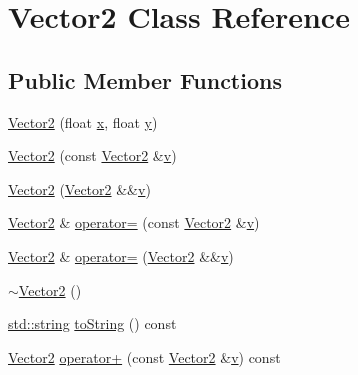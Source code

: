 \hypertarget{class_vector2}{}\section{Vector2 Class Reference}
\label{class_vector2}
\subsection*{Public Member Functions}
\begin{DoxyCompactItemize}
\item 
\mbox{\hyperlink{class_vector2_a061ab58a0e216c759d64e3746d712b12}{Vector2}} (float \mbox{\hyperlink{_s_d_l__opengl_8h_ad0e63d0edcdbd3d79554076bf309fd47}{x}}, float \mbox{\hyperlink{_s_d_l__opengl_8h_a1675d9d7bb68e1657ff028643b4037e3}{y}})
\item 
\mbox{\hyperlink{class_vector2_a299d9e1cd67d3fb587f57170afab9741}{Vector2}} (const \mbox{\hyperlink{class_vector2}{Vector2}} \&\mbox{\hyperlink{_s_d_l__opengl_8h_a10a82eabcb59d2fcd74acee063775f90}{v}})
\item 
\mbox{\hyperlink{class_vector2_a3b31e941af6b8fbdb151b5cfadcc23bc}{Vector2}} (\mbox{\hyperlink{class_vector2}{Vector2}} \&\&\mbox{\hyperlink{_s_d_l__opengl_8h_a10a82eabcb59d2fcd74acee063775f90}{v}})
\item 
\mbox{\hyperlink{class_vector2}{Vector2}} \& \mbox{\hyperlink{class_vector2_a1df081c36e002f10ac92c957c6731065}{operator=}} (const \mbox{\hyperlink{class_vector2}{Vector2}} \&\mbox{\hyperlink{_s_d_l__opengl_8h_a10a82eabcb59d2fcd74acee063775f90}{v}})
\item 
\mbox{\hyperlink{class_vector2}{Vector2}} \& \mbox{\hyperlink{class_vector2_a07657e6cb1e58fe0b3d152c04eadee85}{operator=}} (\mbox{\hyperlink{class_vector2}{Vector2}} \&\&\mbox{\hyperlink{_s_d_l__opengl_8h_a10a82eabcb59d2fcd74acee063775f90}{v}})
\item 
\mbox{\hyperlink{class_vector2_ada03f5433d3ca4841d5ebb90b167202e}{$\sim$\+Vector2}} ()
\item 
\mbox{\hyperlink{_s_d_l__opengl__glext_8h_ab4ccfaa8ab0e1afaae94dc96ef52dde1}{std\+::string}} \mbox{\hyperlink{class_vector2_ab37ebfc71ac92a8e763a386828835ee1}{to\+String}} () const
\item 
\mbox{\hyperlink{class_vector2}{Vector2}} \mbox{\hyperlink{class_vector2_a18759ffa878ab208dbe092ae07e70b6f}{operator+}} (const \mbox{\hyperlink{class_vector2}{Vector2}} \&\mbox{\hyperlink{_s_d_l__opengl_8h_a10a82eabcb59d2fcd74acee063775f90}{v}}) const
\item 

\end{DoxyCompactItemize}
